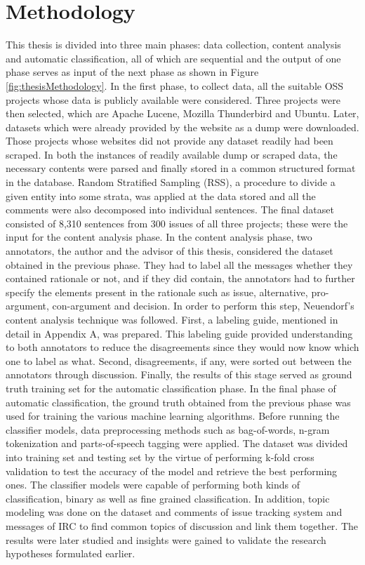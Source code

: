 \documentclass[a4paper,12pt,twoside]{report}
\begin{document}
\section{Methodology}
This thesis is divided into three main phases: data collection, content analysis and automatic classification, all of which are sequential and the output of one phase serves as input of the next phase as shown in Figure \ref{fig:thesisMethodology}. In the first phase, to collect data, all the suitable \acs{OSS} projects whose data is publicly available were considered. Three projects were then selected, which are Apache Lucene, Mozilla Thunderbird and Ubuntu. Later, datasets which were already provided by the website as a dump were downloaded. Those projects whose websites did not provide any dataset readily had been scraped. In both the instances of readily available dump or scraped data, the necessary contents were parsed and finally stored in a common structured format in the database. Random Stratified Sampling (RSS), a procedure to divide a given entity into some strata, was applied at the data stored and all the comments were also decomposed into individual sentences. The final dataset consisted of 8,310 sentences from 300 issues of all three projects; these were the input for the content analysis phase. 
\newline \newline
In the content analysis phase, two annotators, the author and the advisor of this thesis, considered the dataset obtained in the previous phase. They had to label all the messages whether they contained rationale or not, and if they did contain, the annotators had to further specify the elements present in the rationale such as issue, alternative, pro-argument, con-argument and decision. In order to perform this step, Neuendorf's \cite{Neuendorf2017a} content analysis technique was followed. First, a labeling guide, mentioned in detail in Appendix A, was prepared. This labeling guide provided understanding to both annotators to reduce the disagreements since they would now know which one to label as what. Second, disagreements, if any, were sorted out between the annotators through discussion. Finally, the results of this stage served as ground truth training set for the automatic classification phase.  
\newline \newline
In the final phase of automatic classification, the ground truth obtained from the previous phase was used for training the various machine learning algorithms. Before running the classifier models, data preprocessing methods such as bag-of-words, n-gram tokenization and parts-of-speech tagging were applied. The dataset was divided into training set and testing set by the virtue of performing k-fold cross validation to test the accuracy of the model and retrieve the best performing ones. The classifier models were capable of performing both kinds of classification, binary as well as fine grained classification. In addition, topic modeling was done on the dataset and comments of issue tracking system and messages of \acs{IRC} to find common topics of discussion and link them together. The results were later studied and insights were gained to validate the research hypotheses formulated earlier. 
\end{document}
